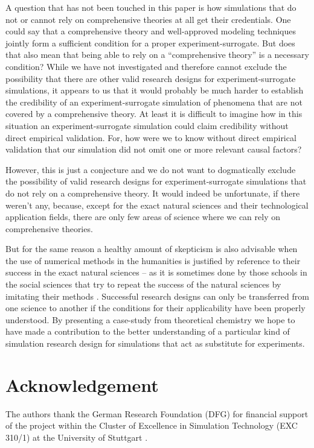\documentclass[12pt, a4paper]{article}
\numberwithin{equation}{section}
\begin{document}
A question that has not been touched in this paper is how simulations
that do not or cannot rely on comprehensive theories at all get their
credentials. One could say that a comprehensive theory and
well-approved modeling techniques jointly form a sufficient condition
for a proper experiment-surrogate. But does that also mean that being
able to rely on a ``comprehensive theory'' is a necessary condition?
While we have not investigated and therefore cannot exclude the
possibility that there are other valid research designs for
experiment-surrogate simulations, it appears to us that it would
probably be much harder to establish the credibility of an
experiment-surrogate simulation of phenomena that are not covered by a
comprehensive theory. At least it is difficult to imagine how in this
situation an experiment-surrogate simulation could claim credibility
without direct empirical validation. For, how were we to know without
direct empirical validation that our simulation did not omit one or
more relevant causal factors?

However, this is just a conjecture and we do not want to dogmatically
exclude the possibility of valid research designs for
experiment-surrogate simulations that do not rely on a comprehensive
theory. It would indeed be unfortunate, if there weren't any, because,
except for the exact natural sciences and their technological
application fields, there are only few areas of science where we can
rely on comprehensive theories.

But for the same reason a healthy amount of skepticism is also
advisable when the use of numerical methods in the humanities is
justified by reference to their success in the exact natural sciences
-- as it is sometimes done by those schools in the social sciences
that try to repeat the success of the natural sciences by imitating
their methods \citep{shapiro:2005}. Successful research designs can
only be transferred from one science to another if the conditions for
their applicability have been properly understood. By presenting a
case-study from theoretical chemistry we hope to have made a
contribution to the better understanding of a particular kind of
simulation research design for simulations that act as substitute for
experiments.



\section*{Acknowledgement} The authors thank the German Research
Foundation (DFG) for financial support of the project within the
Cluster of Excellence in Simulation Technology (EXC 310/1) at the
University of Stuttgart .
\end{document}
